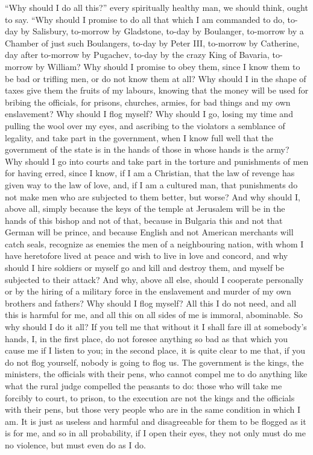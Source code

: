 \documentclass{book}
\begin{document}
“Why should I do all this?” every spiritually healthy man, we should think, ought to say. “Why should I promise to do all that which I am commanded to do, to-day by Salisbury, to-morrow by Gladstone, to-day by Boulanger, to-morrow by a Chamber of just such Boulangers, to-day by Peter III, to-morrow by Catherine, day after to-morrow by Pugachev, to-day by the crazy King of Bavaria, to-morrow by William? Why should I promise to obey them, since I know them to be bad or trifling men, or do not know them at all? Why should I in the shape of taxes give them the fruits of my labours, knowing that the money will be used for bribing the officials, for prisons, churches, armies, for bad things and my own enslavement? Why should I flog myself? Why should I go, losing my time and pulling the wool over my eyes, and ascribing to the violators a semblance of legality, and take part in the government, when I know full well that the government of the state is in the hands of those in whose hands is the army? Why should I go into courts and take part in the torture and punishments of men for having erred, since I know, if I am a Christian, that the law of revenge has given way to the law of love, and, if I am a cultured man, that punishments do not make men who are subjected to them better, but worse? And why should I, above all, simply because the keys of the temple at Jerusalem will be in the hands of this bishop and not of that, because in Bulgaria this and not that German will be prince, and because English and not American merchants will catch seals, recognize as enemies the men of a neighbouring nation, with whom I have heretofore lived at peace and wish to live in love and concord, and why should I hire soldiers or myself go and kill and destroy them, and myself be subjected to their attack? And why, above all else, should I cooperate personally or by the hiring of a military force in the enslavement and murder of my own brothers and fathers? Why should I flog myself? All this I do not need, and all this is harmful for me, and all this on all sides of me is immoral, abominable. So why should I do it all? If you tell me that without it I shall fare ill at somebody’s hands, I, in the first place, do not foresee anything so bad as that which you cause me if I listen to you; in the second place, it is quite clear to me that, if you do not flog yourself, nobody is going to flog us. The government is the kings, the ministers, the officials with their pens, who cannot compel me to do anything like what the rural judge compelled the peasants to do: those who will take me forcibly to court, to prison, to the execution are not the kings and the officials with their pens, but those very people who are in the same condition in which I am. It is just as useless and harmful and disagreeable for them to be flogged as it is for me, and so in all probability, if I open their eyes, they not only must do me no violence, but must even do as I do.
\end{document}
